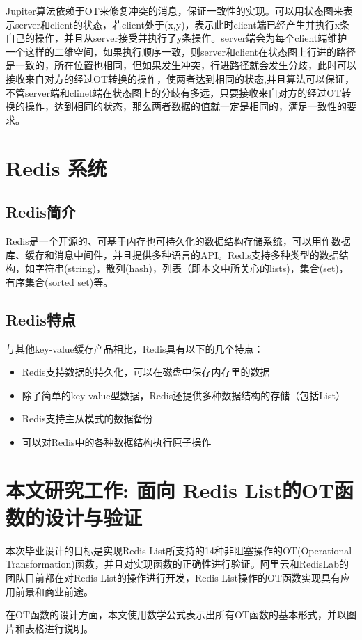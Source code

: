 Jupiter算法依赖于OT来修复冲突的消息，保证一致性的实现。可以用状态图来表示server和client的状态，若client处于(x,y)，表示此时client端已经产生并执行x条自己的操作，并且从server接受并执行了y条操作。server端会为每个client端维护一个这样的二维空间，如果执行顺序一致，则server和client在状态图上行进的路径是一致的，所在位置也相同，但如果发生冲突，行进路径就会发生分歧，此时可以接收来自对方的经过OT转换的操作，使两者达到相同的状态,并且算法可以保证，不管server端和clinet端在状态图上的分歧有多远，只要接收来自对方的经过OT转换的操作，达到相同的状态，那么两者数据的值就一定是相同的，满足一致性的要求。

\section{Redis 系统}
\subsection{Redis简介}
Redis是一个开源的、可基于内存也可持久化的数据结构存储系统，可以用作数据库、缓存和消息中间件，并且提供多种语言的API。Redis支持多种类型的数据结构，如字符串(string)，散列(hash)，列表（即本文中所关心的lists)，集合(set)，有序集合(sorted set)等。
\subsection{Redis特点}
与其他key-value缓存产品相比，Redis具有以下的几个特点：
\begin{itemize}
\item Redis支持数据的持久化，可以在磁盘中保存内存里的数据
\item 除了简单的key-value型数据，Redis还提供多种数据结构的存储（包括List）
\item Redis支持主从模式的数据备份
\item 可以对Redis中的各种数据结构执行原子操作
\end{itemize}
\section{本文研究工作: 面向 Redis List的OT函数的设计与验证}
	\par 本次毕业设计的目标是实现Redis List所支持的14种非阻塞操作的OT(Operational Transformation)函数，并且对实现函数的正确性进行验证。阿里云和RedisLab的团队目前都在对Redis List的操作进行开发，Redis List操作的OT函数实现具有应用前景和商业前途。

	\par 在OT函数的设计方面，本文使用数学公式表示出所有OT函数的基本形式，并以图片和表格进行说明。

